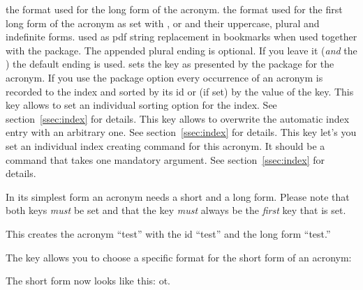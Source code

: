 \documentclass[load-preamble+,scrartcl={DIV10}]{cnltx-doc}
\begin{document}
\begin{options}
    the format used for the long form of the acronym.
    the format used for the first long form of the acronym as set with ,
     or  and their uppercase, plural and indefinite forms.
    used as \acs{pdf} string replacement in bookmarks when used together with the
     package.  The appended plural ending is optional.  If you
   leave it (\emph{and} the \code{/}) the default ending is used.
    sets the  key as presented by the  package
    for the acronym.
    If you use the package option  every
    occurrence of an acronym is recorded to the index and sorted by its
    \ac{id} or (if set) by the value of the  key.  This key
    allows to set an individual sorting option for the index.  See
    section~\ref{ssec:index} for details.
    This key allows to overwrite the automatic index entry
    with an arbitrary one.  See section~\ref{ssec:index} for details.
    This key let's you set an individual index creating
    command for this acronym.  It should be a command that takes one mandatory
    argument.  See section~\ref{ssec:index} for details.
\end{options}

In its simplest form an acronym needs a short and a long form.  Please note
that both keys \emph{must} be set and that the  key \emph{must}
always be the \emph{first} key that is set.
\begin{sourcecode}
\end{sourcecode}
This creates the acronym ``\acs{test}'' with the \acs{id} ``test'' and the
long form ``\acl{test}.''

The  key allows you to choose a specific format for the short
form of an acronym:
\begin{sourcecode}
\end{sourcecode}
The short form now looks like this: \acs{ot}.
\end{document}
